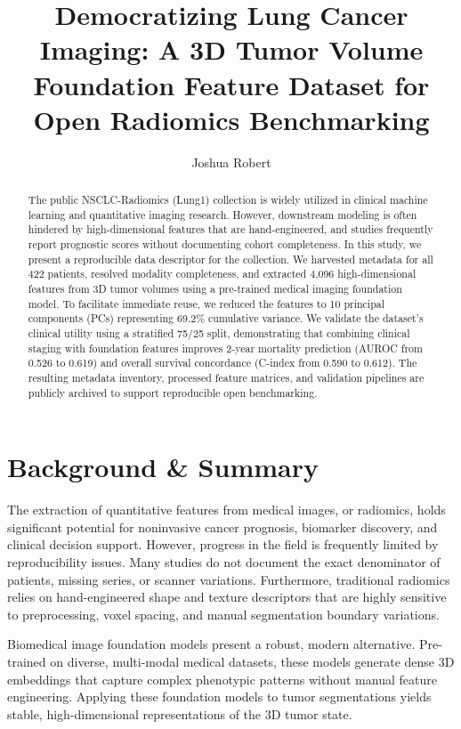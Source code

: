 \documentclass[11pt]{article}
\title{\textbf{Democratizing Lung Cancer Imaging: A 3D Tumor Volume Foundation Feature Dataset for Open Radiomics Benchmarking}}
\author[1,2]{Joshua Robert}
\affil[1]{TAMU School of Engineering Medicine}
\affil[2]{Houston Methodist Hospital}
\date{}
\begin{document}
\maketitle

\begin{abstract}
The public NSCLC-Radiomics (Lung1) collection is widely utilized in clinical machine learning and quantitative imaging research. However, downstream modeling is often hindered by high-dimensional features that are hand-engineered, and studies frequently report prognostic scores without documenting cohort completeness. In this study, we present a reproducible data descriptor for the collection. We harvested metadata for all 422 patients, resolved modality completeness, and extracted 4,096 high-dimensional features from 3D tumor volumes using a pre-trained medical imaging foundation model. To facilitate immediate reuse, we reduced the features to 10 principal components (PCs) representing 69.2\% cumulative variance. We validate the dataset's clinical utility using a stratified 75/25 split, demonstrating that combining clinical staging with foundation features improves 2-year mortality prediction (AUROC from 0.526 to 0.619) and overall survival concordance (C-index from 0.590 to 0.612). The resulting metadata inventory, processed feature matrices, and validation pipelines are publicly archived to support reproducible open benchmarking.
\end{abstract}

\section*{Background \& Summary}
The extraction of quantitative features from medical images, or radiomics, holds significant potential for noninvasive cancer prognosis, biomarker discovery, and clinical decision support. However, progress in the field is frequently limited by reproducibility issues. Many studies do not document the exact denominator of patients, missing series, or scanner variations. Furthermore, traditional radiomics relies on hand-engineered shape and texture descriptors that are highly sensitive to preprocessing, voxel spacing, and manual segmentation boundary variations.

Biomedical image foundation models present a robust, modern alternative. Pre-trained on diverse, multi-modal medical datasets, these models generate dense 3D embeddings that capture complex phenotypic patterns without manual feature engineering. Applying these foundation models to tumor segmentations yields stable, high-dimensional representations of the 3D tumor state.
\end{document}
